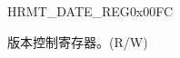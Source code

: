 \begin{register}{H}{RMT\_DATE\_REG}{0x00FC}\label{regdesc:RMTDATEREG}
%
\regnewline%
\begin{regdesc}\begin{reglist}
\item [RMT\_DATE] 版本控制寄存器。(R/W)
\end{reglist}\end{regdesc}
\end{register}
